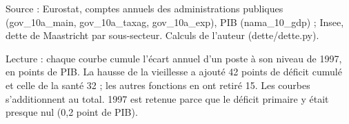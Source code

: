 Source : Eurostat, comptes annuels des administrations publiques (gov\_10a\_main, gov\_10a\_taxag, gov\_10a\_exp), PIB (nama\_10\_gdp) ; Insee, dette de Maastricht par sous-secteur. Calculs de l'auteur (dette/dette.py).\par Lecture : chaque courbe cumule l'écart annuel d'un poste à son niveau de 1997, en points de PIB. La hausse de la vieillesse a ajouté 42 points de déficit cumulé et celle de la santé 32 ; les autres fonctions en ont retiré 15. Les courbes s'additionnent au total. 1997 est retenue parce que le déficit primaire y était presque nul (0,2 point de PIB).
